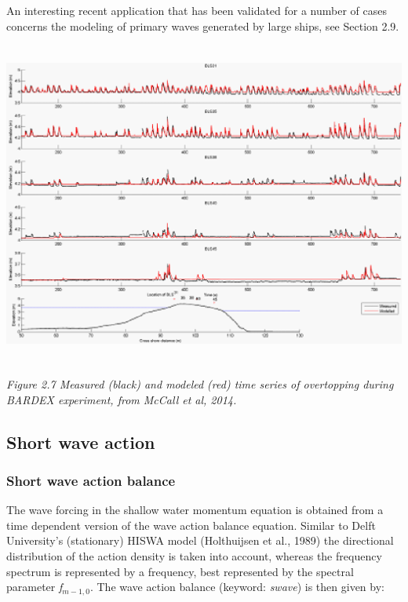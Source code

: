 \documentclass{article}
\begin{document}
\noindent 

\noindent An interesting recent application that has been validated for a number of cases concerns the modeling of primary waves generated by large ships, see Section 2.9. 

\noindent 

\noindent \includegraphics*[width=5.92in, height=4.21in, keepaspectratio=false]{image18}

\noindent \textit{Figure 2.7 Measured (black) and modeled (red) time series of overtopping during BARDEX experiment, from McCall et al, 2014.}

\noindent \eject 


\subsection{ Short wave action }


\subsubsection{ Short wave action balance}

\noindent The wave forcing in the shallow water momentum equation is obtained from a time dependent version of the wave action balance equation. Similar to Delft University's (stationary) HISWA model (Holthuijsen et al., 1989) the directional distribution of the action density is taken into account, whereas the frequency spectrum is represented by a frequency, best represented by the spectral parameter\textit{ f${}_{m-1,0}$}. The wave action balance (keyword: \textit{swave}) is then given by:
\end{document}
